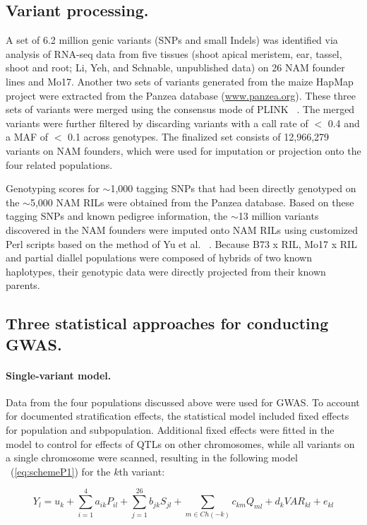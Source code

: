 \documentclass[10pt,letterpaper]{article}
\begin{document}
\subsection*{Variant processing.}
A set of 6.2 million genic variants (SNPs and small Indels) was identified via analysis of RNA-seq data from five tissues (shoot apical meristem, ear, tassel, shoot and root; Li, Yeh, and Schnable, unpublished data) on 26 NAM founder lines and Mo17. Another two sets of variants generated from the maize HapMap project were extracted from the Panzea database (\url{www.panzea.org}). These three sets of variants were merged using the consensus mode of PLINK ~\cite{Purcell2007}. The merged variants were further filtered by discarding variants with a call rate of $<$ 0.4 and a MAF of $<$ 0.1 across genotypes. The finalized set consists of 12,966,279 variants on NAM founders, which were used for imputation or projection onto the four related populations.

Genotyping scores for $\sim$1,000 tagging SNPs that had been directly genotyped on the $\sim$5,000 NAM RILs were obtained from the Panzea database. Based on these tagging SNPs and known pedigree information, the $\sim$13 million variants discovered in the NAM founders were imputed onto NAM RILs using customized Perl scripts based on the method of Yu et al. ~\cite{Yu2008}. Because B73 x RIL, Mo17 x RIL and partial diallel populations were composed of hybrids of two known haplotypes, their genotypic data were directly projected from their known parents. 

\subsection*{Three statistical approaches for conducting GWAS.}
\paragraph{Single-variant model.} 
Data from the four populations discussed above were used for GWAS. To account for documented stratification effects, the statistical model included fixed effects for population and subpopulation. Additional fixed effects were fitted in the model to control for effects of QTLs on other chromosomes, while all variants on a single chromosome were scanned, resulting in the following model ~(\ref{eq:schemeP1}) for the $k$th variant:  

\begin{equation}\label{eq:schemeP1} 
Y_l = u_k + \sum_{i=1}^{4}a_{ik}P_{il} + \sum_{j=1}^{26} b_{jk}S_{jl} + \sum_{m \in Ch(-k)}c_{km}Q_{ml} + d_kVAR_{kl} + e_{kl}
\end{equation}
\end{document}
